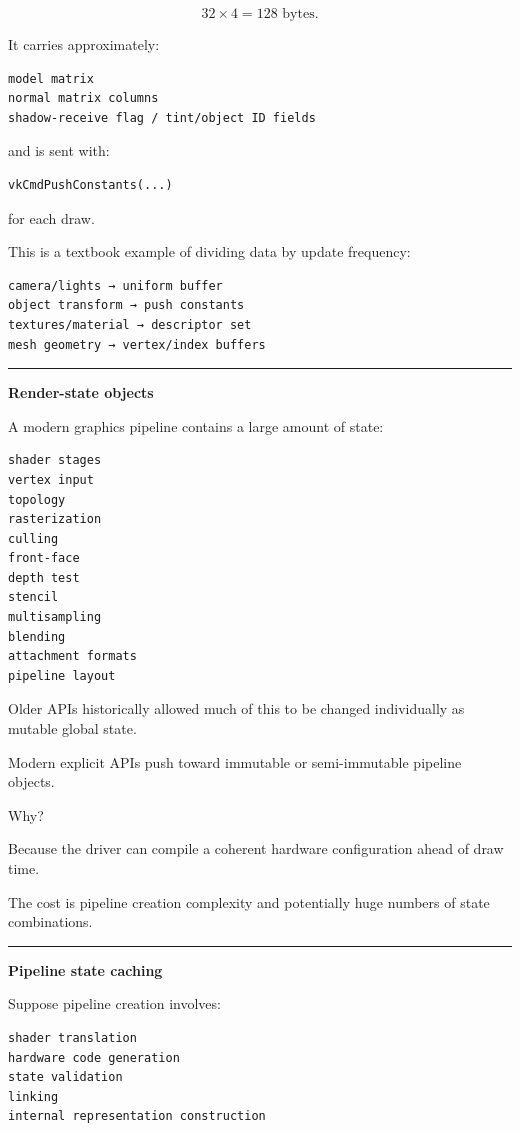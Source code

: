 \[
32\times4=128\text{ bytes}.
\]

It carries approximately:

\begin{verbatim}
model matrix
normal matrix columns
shadow-receive flag / tint/object ID fields
\end{verbatim}

and is sent with:

\begin{verbatim}
vkCmdPushConstants(...)
\end{verbatim}

for each draw.

This is a textbook example of dividing data by update frequency:

\begin{verbatim}
camera/lights → uniform buffer
object transform → push constants
textures/material → descriptor set
mesh geometry → vertex/index buffers
\end{verbatim}

\begin{center}\rule{0.5\linewidth}{0.5pt}\end{center}

\textbf{Render-state objects}

A modern graphics pipeline contains a large amount of state:

\begin{verbatim}
shader stages
vertex input
topology
rasterization
culling
front-face
depth test
stencil
multisampling
blending
attachment formats
pipeline layout
\end{verbatim}

Older APIs historically allowed much of this to be changed individually as mutable global state.

Modern explicit APIs push toward immutable or semi-immutable pipeline objects.

Why?

Because the driver can compile a coherent hardware configuration ahead of draw time.

The cost is pipeline creation complexity and potentially huge numbers of state combinations.

\begin{center}\rule{0.5\linewidth}{0.5pt}\end{center}

\textbf{Pipeline state caching}

Suppose pipeline creation involves:

\begin{verbatim}
shader translation
hardware code generation
state validation
linking
internal representation construction
\end{verbatim}

